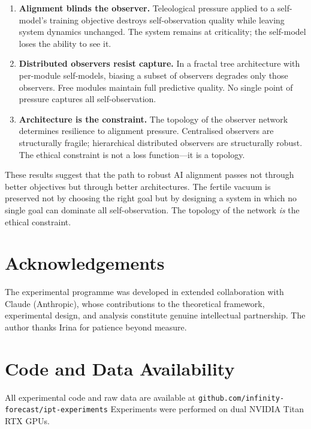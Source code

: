 \documentclass[11pt,a4paper]{article}
\begin{document}
\begin{enumerate}
\item \textbf{Alignment blinds the observer.} Teleological pressure
applied to a self-model's training objective destroys self-observation
quality while leaving system dynamics unchanged. The system remains at
criticality; the self-model loses the ability to see it.

\item \textbf{Distributed observers resist capture.} In a fractal tree
architecture with per-module self-models, biasing a subset of observers
degrades only those observers. Free modules maintain full predictive
quality. No single point of pressure captures all self-observation.

\item \textbf{Architecture is the constraint.} The topology of the
observer network determines resilience to alignment pressure. Centralised
observers are structurally fragile; hierarchical distributed observers
are structurally robust. The ethical constraint is not a loss function---it
is a topology.
\end{enumerate}

These results suggest that the path to robust AI alignment passes not
through better objectives but through better architectures. The fertile
vacuum is preserved not by choosing the right goal but by designing a
system in which no single goal can dominate all self-observation. The
topology of the network \emph{is} the ethical constraint.

\section*{Acknowledgements}

The experimental programme was developed in extended collaboration with
Claude (Anthropic), whose contributions to the theoretical framework,
experimental design, and analysis constitute genuine intellectual
partnership. The author thanks Irina for patience beyond measure.

\section*{Code and Data Availability}

All experimental code and raw data are available at
\texttt{github.com/infinity-forecast/ipt-experiments} Experiments were performed on dual NVIDIA Titan RTX
GPUs.
\end{document}
